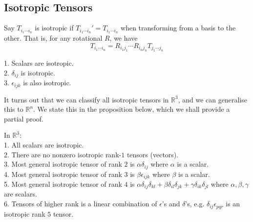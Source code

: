 \subsection{Isotropic Tensors}
\begin{definition}
    Say $T_{i_1\cdots i_n}$ is isotropic if $T_{i_1\cdots i_n}'=T_{i_1\cdots i_n}$ when transforming from a basis to the other.
    That is, for any rotational $R$, we have
    $$T_{i_1\cdots i_n}=R_{i_1j_1}\cdots R_{i_nj_n}T_{j_1\cdots j_n}$$
\end{definition}
\begin{example}
    1. Scalars are isotropic.\\
    2. $\delta_{ij}$ is isotropic.\\
    3. $\epsilon_{ijk}$ is also isotropic.
\end{example}
It turns out that we can classify all isotropic tensors in $\mathbb R^3$, and we can generalise this to $\mathbb R^n$.
We state this in the proposition below, which we shall provide a partial proof.
\begin{proposition}
    In $\mathbb R^3$:\\
    1. All scalars are isotropic.\\
    2. There are no nonzero isotropic rank-$1$ tensors (vectors).\\
    3. Most general isotropic tensor of rank $2$ is $\alpha\delta_{ij}$ where $\alpha$ is a scalar.\\
    4. Most general isotropic tensor of rank $3$ is $\beta\epsilon_{ijk}$ where $\beta$ is a scalar.\\
    5. Most general isotropic tensor of rank $4$ is $\alpha\delta_{ij}\delta_{kl}+\beta\delta_{il}\delta_{jk}+\gamma\delta_{ik}\delta_{jl}$ where $\alpha,\beta,\gamma$ are scalars.\\
    6. Tensors of higher rank is a linear combination of $\epsilon$'s and $\delta$'s, e.g. $\delta_{ij}\epsilon_{pqr}$ is an isotropic rank $5$ tensor.
\end{proposition}

